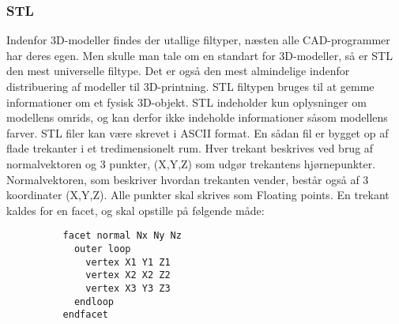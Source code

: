 
\subsubsection{STL} %

Indenfor 3D-modeller findes der utallige filtyper, næsten alle CAD-programmer har deres egen. Men skulle man tale om en standart for 3D-modeller, så er STL den mest universelle filtype. Det er også den mest almindelige indenfor distribuering af modeller til 3D-printning. \autocite{_getting_????}
STL filtypen bruges til at gemme informationer om et fysisk 3D-objekt. STL indeholder kun oplysninger om modellens omrids, og kan derfor ikke indeholde informationer såsom modellens farver. 
STL filer kan være skrevet i ASCII format. 
En sådan fil er bygget op af flade trekanter i et tredimensionelt rum. 
Hver trekant beskrives ved brug af normalvektoren og 3 punkter, (X,Y,Z) som udgør trekantens hjørnepunkter. Normalvektoren, som beskriver hvordan trekanten vender, består også af 3 koordinater (X,Y,Z). Alle punkter skal skrives som Floating points\autocite{_stla_????}.
En trekant kaldes for en facet, og skal opstille på følgende måde:
\begin{lstlisting}
          facet normal Nx Ny Nz
            outer loop
              vertex X1 Y1 Z1
              vertex X2 X2 Z2
              vertex X3 Y3 Z3
            endloop
          endfacet
\end{lstlisting}

